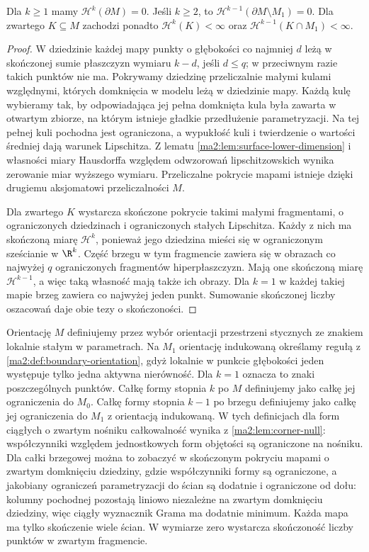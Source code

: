 \begin{lemat}
\label{ma2:lem:corner-null}
Dla $k\ge1$ mamy $\mathcal H^k(\partial M)=0$.
Jeśli $k\ge2$, to
$\mathcal H^{k-1}(\partial M\setminus M_1)=0$.
Dla zwartego $K\subseteq M$ zachodzi ponadto
$\mathcal H^k(K)<\infty$ oraz
$\mathcal H^{k-1}(K\cap M_1)<\infty$.
\end{lemat}
\begin{proof}
W dziedzinie każdej mapy punkty o głębokości
co najmniej $d$ leżą w skończonej sumie
płaszczyzn wymiaru $k-d$, jeśli $d\le q$;
w przeciwnym razie takich punktów nie ma.
Pokrywamy dziedzinę przeliczalnie małymi
kulami względnymi, których domknięcia
w modelu leżą w dziedzinie mapy.
Każdą kulę wybieramy tak, by odpowiadająca
jej pełna domknięta kula była zawarta
w otwartym zbiorze, na którym istnieje
gładkie przedłużenie parametryzacji.
Na tej pełnej kuli pochodna jest ograniczona,
a wypukłość kuli i twierdzenie o wartości
średniej dają warunek Lipschitza.
Z lematu \ref{ma2:lem:surface-lower-dimension}
i własności miary Hausdorffa względem odwzorowań
lipschitzowskich wynika zerowanie miar
wyższego wymiaru. Przeliczalne pokrycie
mapami istnieje dzięki drugiemu aksjomatowi
przeliczalności $M$.

Dla zwartego $K$ wystarcza skończone pokrycie
takimi małymi fragmentami, o ograniczonych
dziedzinach i ograniczonych stałych
Lipschitza. Każdy z nich ma skończoną
miarę $\mathcal H^k$, ponieważ jego dziedzina
mieści się w ograniczonym sześcianie w $\R^k$.
Część brzegu w tym fragmencie zawiera się
w obrazach co najwyżej $q$ ograniczonych
fragmentów hiperpłaszczyzn. Mają one
skończoną miarę $\mathcal H^{k-1}$, a więc
taką własność mają także ich obrazy.
Dla $k=1$ w każdej takiej mapie brzeg
zawiera co najwyżej jeden punkt.
Sumowanie skończonej liczby oszacowań
daje obie tezy o skończoności.
\end{proof}

Orientację $M$ definiujemy przez wybór orientacji
przestrzeni stycznych ze znakiem lokalnie stałym
w parametrach. Na $M_1$ orientację indukowaną
określamy regułą z \ref{ma2:def:boundary-orientation},
gdyż lokalnie w punkcie głębokości jeden
występuje tylko jedna aktywna nierówność.
Dla $k=1$ oznacza to znaki poszczególnych punktów.
Całkę formy stopnia $k$ po $M$ definiujemy
jako całkę jej ograniczenia do $M_0$.
Całkę formy stopnia $k-1$ po brzegu
definiujemy jako całkę jej ograniczenia do $M_1$
z orientacją indukowaną.
W tych definicjach dla form ciągłych
o zwartym nośniku całkowalność wynika
z \ref{ma2:lem:corner-null}: współczynniki
względem jednostkowych form objętości są
ograniczone na nośniku. Dla całki brzegowej
można to zobaczyć w skończonym pokryciu
mapami o zwartym domknięciu dziedziny,
gdzie współczynniki formy są ograniczone,
a jakobiany ograniczeń parametryzacji do ścian
są dodatnie i ograniczone od dołu: kolumny
pochodnej pozostają liniowo niezależne
na zwartym domknięciu dziedziny, więc
ciągły wyznacznik Grama ma dodatnie minimum.
Każda mapa ma tylko skończenie wiele ścian.
W wymiarze zero wystarcza skończoność
liczby punktów w zwartym fragmencie.

